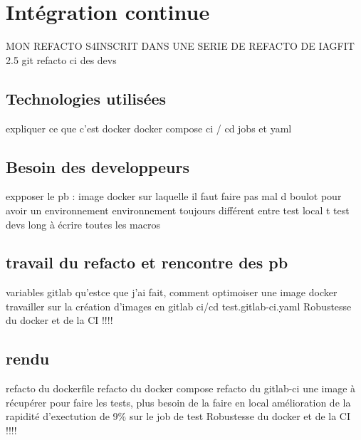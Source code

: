 \section{Intégration continue}
MON REFACTO S4INSCRIT DANS UNE SERIE DE REFACTO DE IAGFIT 2.5
git refacto ci des devs
\subsection{Technologies utilisées}
expliquer ce que c'est
                    docker
                    docker compose
                    ci / cd
                    jobs et yaml

\subsection{Besoin des developpeurs}
expposer le pb : image docker sur laquelle il faut faire pas mal d boulot pour avoir un environnement
                    environnement toujours différent entre test local t test devs
                    long à écrire toutes les macros

\subsection{travail du refacto et rencontre des pb}
variables gitlab
qu'estce que j'ai fait, comment optimoiser une image docker
travailler sur la création d'images en gitlab ci/cd test.gitlab-ci.yaml
Robustesse du docker et de la CI !!!!

\subsection{rendu}
refacto du dockerfile
refacto du docker compose
refacto du gitlab-ci
    une image à récupérer pour faire les tests, plus besoin de la faire en local
    amélioration de la rapidité d'exectution de 9\% sur le job de test
    Robustesse du docker et de la CI !!!!
